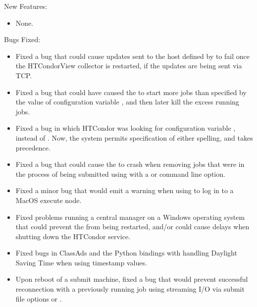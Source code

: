 \noindent New Features:

\begin{itemize}

\item None.

\end{itemize}

\noindent Bugs Fixed:

\begin{itemize}

\item Fixed a bug that could cause updates sent to
the host defined by  
to fail once the HTCondorView collector is restarted,
if the updates are being sent via TCP.

\item Fixed a bug that could have caused the  to start more 
jobs than specified by the value of configuration variable 
,
and then later kill the excess running jobs.

\item Fixed a bug in which HTCondor was looking for configuration variable
, instead of .
Now, the system permits specification of either spelling,
and  takes precedence.

\item Fixed a bug that could cause the  to crash
when removing jobs that were in the process of being submitted
using  with a  or  
command line option.

\item Fixed a minor bug that would emit a  warning
when using  to log in to a MacOS execute node.
 
\item Fixed problems running a central manager on a Windows operating
system that could prevent the  from being restarted,
and/or could cause delays when shutting down the HTCondor service.

\item Fixed bugs in ClassAds and the Python bindings with handling
Daylight Saving Time when using timestamp values.

\item Upon reboot of a submit machine, fixed a bug that would 
	prevent successful reconnection with
	a previously running job 
	using streaming I/O via submit file
	options  or .


\end{itemize}
